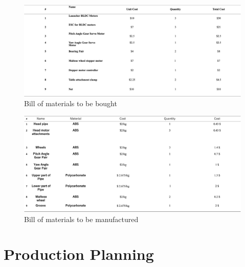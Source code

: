 \documentclass[12pt]{article}
\begin{document}
\begin{appendices}
\begin{figure}[H]
    \centering
    \includegraphics[width=\textwidth]{Bill of materials 1.png} 
    \caption{Bill of materials to be bought}
    \label{fig:bill-of-materials}
\end{figure}

\begin{figure}[H]
    \centering
    \includegraphics[width=\textwidth]{Bill of materials 2.png} %
    \caption{Bill of materials to be manufactured}
    \label{fig:bill-of-materials}
\end{figure}
\section{Production Planning}


\end{appendices}
\end{document}
